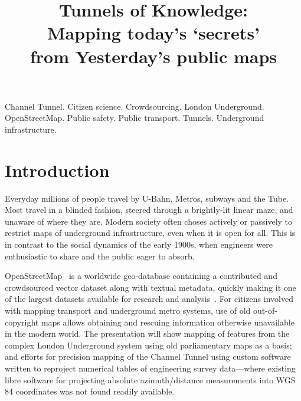 \documentclass[conference,a4paper]{IEEEtran}
\begin{document}
\vspace{-1em}
\title{\hphantom{:}Tunnels of Knowledge:\\
\vspace{-0.6em}
{\Large \hphantom{'}Mapping today's `secrets'\\\vspace{-0.8em} from Yesterday's public maps}\\
}
\author{%
  \texorpdfstring{%
}{Paul Sladen}}
\maketitle

\begin{IEEEkeywords}
Channel Tunnel.
Citizen science.
Crowdsourcing.
London Underground.
OpenStreetMap.
Public safety.
Public transport.
Tunnels.
Underground infrastructure.
\end{IEEEkeywords}

\IEEEpeerreviewmaketitle

\section{Introduction}
Everyday millions of people travel by U-Bahn, Metros, subways and the
Tube. Most travel in a blinded fashion, steered through a brightly-lit
linear maze, and unaware of where they are. Modern society often
choses actively or passively to restrict maps of underground
infrastructure, even when it is open for all. This is in contrast to
the social dynamics of the early 1900s, when engineers were
enthusiastic to share and the public eager to absorb.

OpenStreetMap~\cite{openstreetmap} is a worldwide geo-database containing a contributed and
crowdsourced vector dataset along with textual metadata, quickly making it one
of the largest datasets available for research and analysis~\cite{street-2006}. For
citizens involved with mapping transport and underground metro
systems, use of old out-of-copyright maps allows obtaining and
rescuing information otherwise unavailable in the modern world. The
presentation will show mapping of features from the complex London
Underground system using old parliamentary maps as a basis; and
efforts for precision mapping of the Channel Tunnel using custom
software written to reproject numerical tables of engineering
survey data---where existing libre software 
for projecting absolute azimuth/distance measurements into WGS\,84 coordinates was not found readily available.
\end{document}
